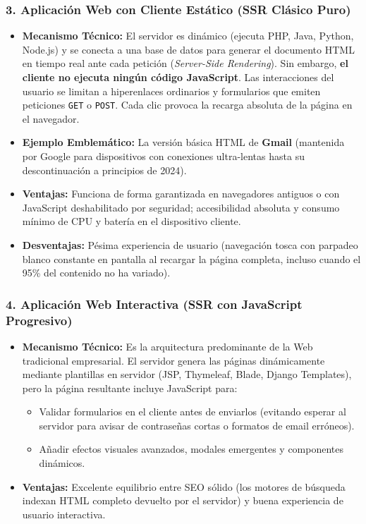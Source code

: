 \subsubsection{3. Aplicación Web con Cliente Estático (SSR Clásico Puro)}
\begin{itemize}[leftmargin=1.2cm]
  \item \textbf{Mecanismo Técnico:} El servidor es dinámico (ejecuta PHP, Java, Python, Node.js) y se conecta a una base de datos para generar el documento HTML en tiempo real ante cada petición (\textit{Server-Side Rendering}). Sin embargo, \textbf{el cliente no ejecuta ningún código JavaScript}. Las interacciones del usuario se limitan a hiperenlaces ordinarios y formularios que emiten peticiones \texttt{GET} o \texttt{POST}. Cada clic provoca la recarga absoluta de la página en el navegador.
  \item \textbf{Ejemplo Emblemático:} La versión básica HTML de \textbf{Gmail} (mantenida por Google para dispositivos con conexiones ultra-lentas hasta su descontinuación a principios de 2024).
  \item \textbf{Ventajas:} Funciona de forma garantizada en navegadores antiguos o con JavaScript deshabilitado por seguridad; accesibilidad absoluta y consumo mínimo de CPU y batería en el dispositivo cliente.
  \item \textbf{Desventajas:} Pésima experiencia de usuario (navegación tosca con parpadeo blanco constante en pantalla al recargar la página completa, incluso cuando el 95\% del contenido no ha variado).
\end{itemize}

\subsubsection{4. Aplicación Web Interactiva (SSR con JavaScript Progresivo)}
\begin{itemize}[leftmargin=1.2cm]
  \item \textbf{Mecanismo Técnico:} Es la arquitectura predominante de la Web tradicional empresarial. El servidor genera las páginas dinámicamente mediante plantillas en servidor (JSP, Thymeleaf, Blade, Django Templates), pero la página resultante incluye JavaScript para:
    \begin{itemize}
      \item Validar formularios en el cliente antes de enviarlos (evitando esperar al servidor para avisar de contraseñas cortas o formatos de email erróneos).
      \item Añadir efectos visuales avanzados, modales emergentes y componentes dinámicos.
    \end{itemize}
  \item \textbf{Ventajas:} Excelente equilibrio entre SEO sólido (los motores de búsqueda indexan HTML completo devuelto por el servidor) y buena experiencia de usuario interactiva.
\end{itemize}

